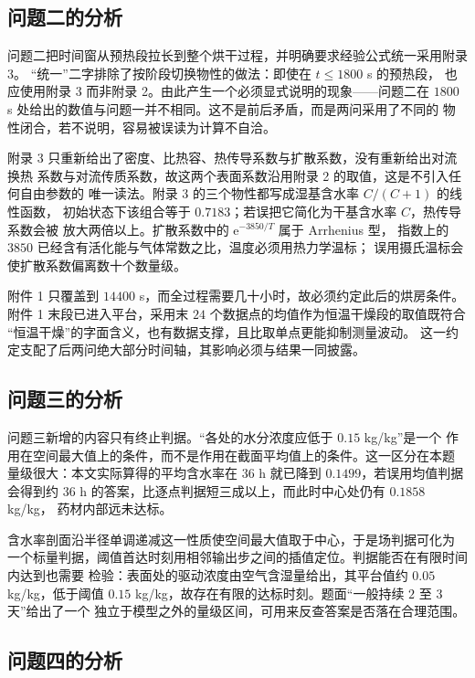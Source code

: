 \subsection{问题二的分析}

问题二把时间窗从预热段拉长到整个烘干过程，并明确要求经验公式统一采用附录 3。
“统一”二字排除了按阶段切换物性的做法：即使在 $t\le1800$ s 的预热段，
也应使用附录 3 而非附录 2。由此产生一个必须显式说明的现象——问题二在
$1800$ s 处给出的数值与问题一并不相同。这不是前后矛盾，而是两问采用了不同的
物性闭合，若不说明，容易被误读为计算不自洽。

附录 3 只重新给出了密度、比热容、热传导系数与扩散系数，没有重新给出对流换热
系数与对流传质系数，故这两个表面系数沿用附录 2 的取值，这是不引入任何自由参数的
唯一读法。附录 3 的三个物性都写成湿基含水率 $C/(C+1)$ 的线性函数，
初始状态下该组合等于 $0.7183$；若误把它简化为干基含水率 $C$，热传导系数会被
放大两倍以上。扩散系数中的 $\mathrm{e}^{-3850/T}$ 属于 Arrhenius 型，
指数上的 $3850$ 已经含有活化能与气体常数之比，温度必须用热力学温标；
误用摄氏温标会使扩散系数偏离数十个数量级。

附件 1 只覆盖到 $14400$ s，而全过程需要几十小时，故必须约定此后的烘房条件。
附件 1 末段已进入平台，采用末 $24$ 个数据点的均值作为恒温干燥段的取值既符合
“恒温干燥”的字面含义，也有数据支撑，且比取单点更能抑制测量波动。
这一约定支配了后两问绝大部分时间轴，其影响必须与结果一同披露。

\subsection{问题三的分析}

问题三新增的内容只有终止判据。“各处的水分浓度应低于 $0.15$ kg/kg”是一个
作用在空间最大值上的条件，而不是作用在截面平均值上的条件。这一区分在本题
量级很大：本文实际算得的平均含水率在 $36$ h 就已降到 $0.1499$，若误用均值判据
会得到约 $36$ h 的答案，比逐点判据短三成以上，而此时中心处仍有 $0.1858$ kg/kg，
药材内部远未达标。

含水率剖面沿半径单调递减这一性质使空间最大值取于中心，于是场判据可化为
一个标量判据，阈值首达时刻用相邻输出步之间的插值定位。判据能否在有限时间内达到也需要
检验：表面处的驱动浓度由空气含湿量给出，其平台值约 $0.05$ kg/kg，低于阈值
$0.15$ kg/kg，故存在有限的达标时刻。题面“一般持续 $2$ 至 $3$ 天”给出了一个
独立于模型之外的量级区间，可用来反查答案是否落在合理范围。

\subsection{问题四的分析}

